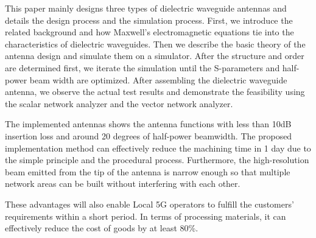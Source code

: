 \documentclass[a4paper,12pt]{report}
\begin{document}
This paper mainly designs three types of dielectric waveguide antennas
and details the design process and the simulation process.
First, we introduce the related background
and how Maxwell's electromagnetic equations tie into the characteristics
of dielectric waveguides.
Then we describe the basic theory of the antenna design
and simulate them on a simulator.
After the structure and order are determined first,
we iterate the simulation until
the S-parameters and half-power beam width are optimized.
After
assembling the dielectric waveguide antenna,
we observe the actual
test results and demonstrate the feasibility
using the scalar network analyzer and the vector network analyzer.

The implemented antennas shows the antenna functions with less than 10dB
insertion loss and around 20 degrees of half-power beamwidth.
The proposed implementation
method can effectively reduce the machining time in 1 day
due to the simple principle and the procedural process.
Furthermore, the high-resolution beam
emitted from the tip of the antenna is narrow enough so
that multiple network areas can be built without interfering with each other.

These advantages will also enable Local 5G operators
to fulfill the customers' requirements within a short period. In terms of
processing materials,
it can effectively reduce the cost of goods by at least
80\%.
\end{document}
